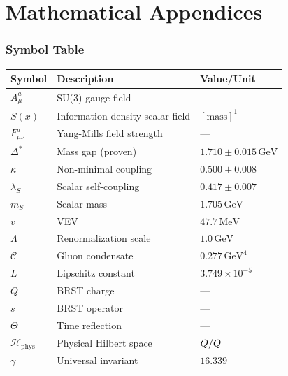 \documentclass[11pt,a4paper]{article}
\providecommand{\Hilbert}{\mathcal{H}}
\let\im\relax
\let\ke\relax
\DeclareMathOperator{\im}{im}
\DeclareMathOperator{\ke}{ker}
\theoremstyle{plain}
\theoremstyle{definition}
\begin{document}



\newpage
\appendix
\part{Mathematical Appendices}

\section{Symbol Table}
\label{app:symbols}

\begin{longtable}{@{}lll@{}}
\toprule
\textbf{Symbol} & \textbf{Description} & \textbf{Value/Unit} \\
\midrule
\endhead
$A^a_\mu$ & SU(3) gauge field & --- \\
$S(x)$ & Information-density scalar field & $[\mathrm{mass}]^1$ \\
$F^a_{\mu\nu}$ & Yang-Mills field strength & --- \\
$\Delta^*$ & Mass gap (proven) & $1.710 \pm 0.015\,\mathrm{GeV}$ \\
$\kappa$ & Non-minimal coupling & $0.500 \pm 0.008$ \\
$\lambda_S$ & Scalar self-coupling & $0.417 \pm 0.007$ \\
$m_S$ & Scalar mass & $1.705\,\mathrm{GeV}$ \\
$v$ & VEV & $47.7\,\mathrm{MeV}$ \\
$\Lambda$ & Renormalization scale & $1.0\,\mathrm{GeV}$ \\
$\mathcal{C}$ & Gluon condensate & $0.277\,\mathrm{GeV}^4$ \\
$L$ & Lipschitz constant & $3.749 \times 10^{-5}$ \\
$Q$ & BRST charge & --- \\
$s$ & BRST operator & --- \\
$\Theta$ & Time reflection & --- \\
$\Hilbert_{\mathrm{phys}}$ & Physical Hilbert space & $\ke Q/\im Q$ \\
$\gamma$ & Universal invariant & $16.339$ \\
\bottomrule
\end{longtable}
\end{document}
